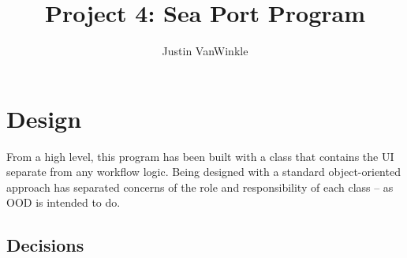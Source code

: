 \documentclass[english,floatsintext,man]{apa6}
\title{Project 4: Sea Port Program}
\author{Justin VanWinkle}
\affiliation{
    \vspace{0.5cm}
          \textsuperscript{} 7 May 2017  }
\begin{document}
\maketitle

\setcounter{secnumdepth}{0}



\section{Design}\label{design}

From a high level, this program has been built with a class that
contains the UI separate from any workflow logic. Being designed with a
standard object-oriented approach has separated concerns of the role and
responsibility of each class -- as OOD is intended to do.

\subsection{Decisions}\label{decisions}
\end{document}
